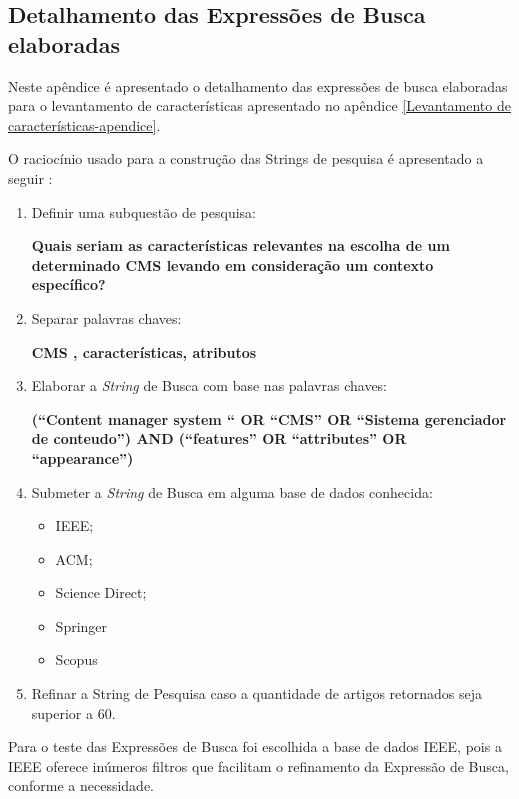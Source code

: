 \begin{apendicesenv}

\partapendices

\chapter{Detalhamento das Expressões de Busca elaboradas }
\label{ExpressoesdeBusca}

Neste apêndice é apresentado o detalhamento das expressões de busca elaboradas para o levantamento de características apresentado no apêndice \ref{Levantamento de características-apendice}.


O raciocínio usado para a construção das Strings de pesquisa é apresentado a seguir :

\begin{enumerate}
\item Definir uma subquestão de pesquisa:

		\textbf{Quais seriam as características relevantes na escolha de um determinado CMS levando em consideração um contexto específico?}
		
\item Separar palavras chaves:

\textbf{CMS , características, atributos }

\item Elaborar a \textit{String} de Busca com base nas palavras chaves:

\textbf{(“Content manager system “ OR “CMS” OR “Sistema gerenciador de conteudo”) AND (“features” OR “attributes” OR “appearance”)}

\item Submeter a \textit{String} de Busca em alguma base de dados conhecida: 
 \begin{itemize}
 \item IEEE;
 \item ACM;
 \item Science Direct;
 \item Springer
 \item Scopus
 \end{itemize}
 
\item Refinar a String de Pesquisa caso a quantidade de artigos retornados seja superior a 60.
\end{enumerate}

Para o teste das Expressões de Busca foi escolhida a base de dados IEEE, pois a IEEE oferece inúmeros filtros que facilitam o refinamento da Expressão de Busca, conforme a necessidade.


\end{apendicesenv}
